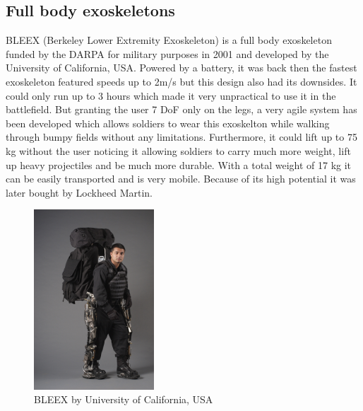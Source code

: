 \documentclass[letterpaper, 10 pt, conference]{ieeeconf}  %
\begin{document}
\subsection{Full body exoskeletons}

BLEEX (Berkeley Lower Extremity Exoskeleton) is a full body exoskeleton funded by the DARPA for military purposes
in 2001 and developed by the University of California, USA. Powered by a battery, it was back then the fastest
exoskeleton featured speeds up to 2m/s but this design also had its downsides. It could only run up to 3 hours which
made it very unpractical to use it in the battlefield. But granting the user 7 DoF only on the legs,
a very agile system has been developed which allows soldiers to wear this exoskelton while walking through bumpy fields
without any limitations. Furthermore, it could lift up to 75 kg without the user noticing it allowing soldiers
to carry much more weight, lift up heavy projectiles and be much more durable.
With a total weight of 17 kg it can be easily transported and is very mobile. Because of its high potential it was
later bought by Lockheed Martin. \newpage


\begin{figure}[H]
  \centering
    \includegraphics[width=0.4\textwidth]{img/bleex}
  \caption{BLEEX by University of California, USA}
\end{figure} 

\end{document}
